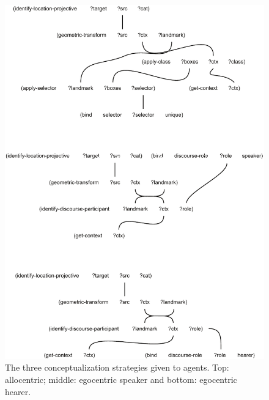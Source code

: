 \begin{figure}
\includegraphics[width=1.0\columnwidth]{figs/chunk-alignment-chunks}
\caption[Conceptualization strategies]{The three conceptualization strategies given to agents. Top: allocentric; middle: egocentric speaker
and bottom: egocentric hearer.}
\label{f:chunk-alignment-chunks}
\end{figure}

